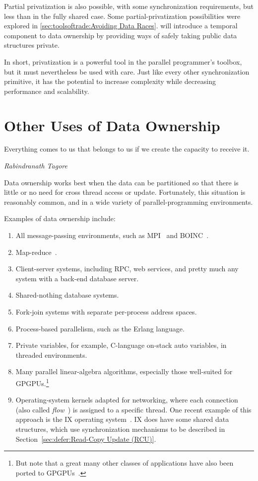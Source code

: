 Partial privatization is also possible, with some synchronization
requirements, but less than in the fully shared case.
Some partial-privatization possibilities were explored in
\cref{sec:toolsoftrade:Avoiding Data Races}.
 will introduce a temporal component
to data ownership by providing ways of safely taking public data
structures private.

In short, privatization is a powerful tool in the parallel programmer's
toolbox, but it must nevertheless be used with care.
Just like every other synchronization primitive, it has the potential
to increase complexity while decreasing performance and scalability.

\section{Other Uses of Data Ownership}
\label{sec:owned:Other Uses of Data Ownership}
%
\epigraph{Everything comes to us that belongs to us if we create the
	  capacity to receive it.}
	 {\emph{Rabindranath Tagore}}

Data ownership works best when the data can be partitioned so that there
is little or no need for cross thread access or update.
Fortunately, this situation is reasonably common, and in a wide variety
of parallel-programming environments.

Examples of data ownership include:

\begin{enumerate}
\item	All message-passing environments, such as MPI~\cite{MPIForum2008}
	and BOINC~\cite{BOINC2008}.
\item	Map-reduce~\cite{MapReduce2008MIT}.
\item	Client-server systems, including RPC, web services, and
	pretty much any system with a back-end database server.
\item	Shared-nothing database systems.
\item	Fork-join systems with separate per-process address spaces.
\item	Process-based parallelism, such as the Erlang language.
\item	Private variables, for example, C-language on-stack auto variables,
	in threaded environments.
\item	Many parallel linear-algebra algorithms, especially those
	well-suited for GPGPUs.\footnote{
		But note that a great many other classes of applications
		have also been ported to
		GPGPUs~\cite{NormMatloff2017ParProcBook,AMD2020ROCm,NVidia2017GPGPU,NVidia2017GPGPU-university}.}
\item	Operating-system kernels adapted for networking, where each connection
	(also called \emph{flow}~\cite{Shenker89,ZhangPhD,McKenney90})
	is assigned to a specific thread.
	One recent example of this approach is the IX operating
	system~\cite{Belay:2016:IOS:3014162.2997641}.
	IX does have some shared data structures, which use synchronization
	mechanisms to be described in
	Section~\ref{sec:defer:Read-Copy Update (RCU)}.
\end{enumerate}

